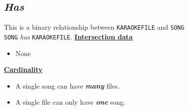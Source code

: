 \documentclass{report}
\begin{document}
    \subsection{ \textit{\textbf{Has}}} 
    This is a binary relationship between \texttt{KARAOKEFILE} and \texttt{SONG} \vspace{4mm} \\
    \texttt{SONG} \textit{has} \texttt{KARAOKEFILE}.
    \bigbreak \noindent
    \underline{\textbf{Intersection data}}
    \begin{itemize}
        \item None
    \end{itemize}
    \bigbreak \noindent
    \underline{\textbf{Cardinality}}
    \begin{itemize}
        \item A single song can have \textit{\textbf{many}} files.
        \item A single file can only have \textit{\textbf{one}} song.
    \end{itemize}
\end{document}
